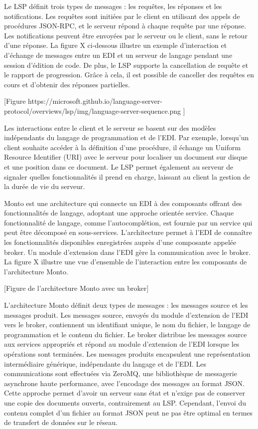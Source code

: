 Le LSP définit trois types de messages : les requêtes, les réponses et les notifications. Les requêtes sont initiées par le client en utilisant des appels de procédures JSON-RPC, et le serveur répond à chaque requête par une réponse. Les notifications peuvent être envoyées par le serveur ou le client, sans le retour d'une réponse. La figure X ci-dessous illustre un exemple d'interaction et d'échange de messages entre un EDI et un serveur de langage pendant une session d'édition de code. De plus, le LSP supporte la cancellation de requête et le rapport de progression. Grâce à cela, il est possible de canceller des requêtes en cours et d'obtenir des réponses partielles.

[Figure https://microsoft.github.io/language-server-protocol/overviews/lsp/img/language-server-sequence.png ]

Les interactions entre le client et le serveur se basent sur des modèles indépendants du langage de programmation et de l'EDI. Par exemple, lorsqu'un client souhaite accéder à la définition d'une procédure, il échange un Uniform Resource Identifier (URI) avec le serveur pour localiser un document sur disque et une position dans ce document. Le LSP permet également au serveur de signaler quelles fonctionnalités il prend en charge, laissant au client la gestion de la durée de vie du serveur.

Monto est une architecture qui connecte un EDI à des composants offrant des fonctionnalités de langage, adoptant une approche orientée service. Chaque fonctionnalité de langage, comme l'autocomplétion, est fournie par un service qui peut être décomposé en sous-services. L'architecture permet à l'EDI de connaître les fonctionnalités disponibles enregistrées auprès d'une composante appelée broker. Un module d'extension dans l'EDI gère la communication avec le broker. La figure X illustre une vue d'ensemble de l'interaction entre les composants de l'architecture Monto.

[Figure de l'architecture Monto avec un broker]


L'architecture Monto définit deux types de messages : les messages source et les messages produit. Les messages source, envoyés du module d'extension de l'EDI vers le broker, contiennent un identifiant unique, le nom du fichier, le langage de programmation et le contenu du fichier. Le broker distribue les messages source aux services appropriés et répond au module d'extension de l'EDI lorsque les opérations sont terminées. Les messages produits encapsulent une représentation intermédiaire générique, indépendante du langage et de l'EDI. Les communications sont effectuées via ZeroMQ, une bibliothèque de messagerie asynchrone haute performance, avec l'encodage des messages au format JSON. Cette approche permet d'avoir un serveur sans état et n'exige pas de conserver une copie des documents ouverts, contrairement au LSP. Cependant, l'envoi du contenu complet d'un fichier au format JSON peut ne pas être optimal en termes de transfert de données sur le réseau.


